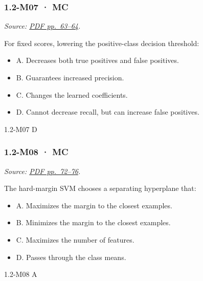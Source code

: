 \noindent\begin{minipage}{\linewidth}

\subsubsection{1.2-M07 · MC}\label{m07-mc-1}

\emph{Source:
\href{../Lecture\%20Slides/1.2.\%20Shallow\%20Learning.pdf\#page=63}{PDF
pp.~63--64}.}

For fixed scores, lowering the positive-class decision threshold:

\begin{itemize}
\tightlist
\item
  A. Decreases both true positives and false positives.
\item
  B. Guarantees increased precision.
\item
  C. Changes the learned coefficients.
\item
  D. Cannot decrease recall, but can increase false positives.
\end{itemize}

\begin{solution}[8mm]{1.2-M07}
D
\end{solution}
\end{minipage}\par\medskip

\noindent\begin{minipage}{\linewidth}

\subsubsection{1.2-M08 · MC}\label{m08-mc-1}

\emph{Source:
\href{../Lecture\%20Slides/1.2.\%20Shallow\%20Learning.pdf\#page=72}{PDF
pp.~72--76}.}

The hard-margin SVM chooses a separating hyperplane that:

\begin{itemize}
\tightlist
\item
  A. Maximizes the margin to the closest examples.
\item
  B. Minimizes the margin to the closest examples.
\item
  C. Maximizes the number of features.
\item
  D. Passes through the class means.
\end{itemize}

\begin{solution}[8mm]{1.2-M08}
A
\end{solution}
\end{minipage}\par\medskip

